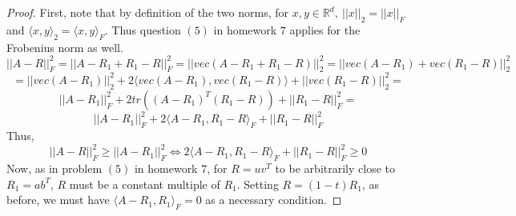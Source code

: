 \documentclass[11pt]{article}
\theoremstyle{quest}
\begin{document}
\begin{proof}
First, note that by definition of the two norms, for $x,y \in \mathbb{R}^d,\ ||x||_2 = ||x||_F$ and $\langle x,y \rangle_2 = \langle x,y \rangle_F$. Thus question $(5)$ in homework $7$ applies for the Frobenius norm as well.
$$||A-R||_F^2 = ||A-R_1+R_1-R||_F^2 = ||vec(A-R_1+R_1-R)||_2^2 = ||vec(A-R_1)+vec(R_1-R)||_2^2$$
$$=||vec(A-R_1)||_2^2 + 2\langle vec(A-R_1), vec(R_1-R) \rangle + ||vec(R_1-R)||_2^2 =$$
$$||A-R_1||_F^2 + 2tr((A-R_1)^T(R_1-R)) + ||R_1-R||_F^2 =$$
$$||A-R_1||_F^2 + 2\langle A-R_1, R_1-R\rangle_F + ||R_1-R||_F^2$$
Thus,
$$||A-R||_F^2 \ge ||A-R_1||_F^2 \iff 2\langle A-R_1, R_1-R\rangle_F + ||R_1-R||_F^2 \ge 0$$
Now, as in problem $(5)$ in homework $7$, for $R = uv^T$ to be arbitrarily close to $R_1 = ab^T$, $R$ must be a constant multiple of $R_1$. Setting $R = (1-t)R_1$, as before, we must have $\langle A-R_1, R_1 \rangle_F = 0$ as a necessary condition.
\end{proof}
\end{document}
